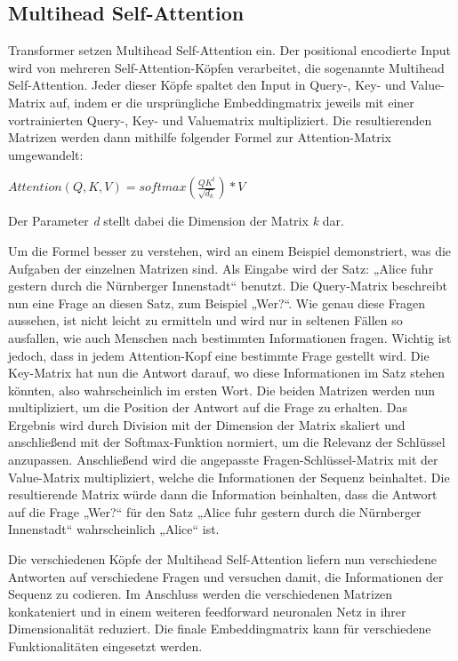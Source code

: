 \subsection{Multihead Self-Attention}

Transformer setzen Multihead Self-Attention ein.
Der positional encodierte Input wird von mehreren Self-Attention-Köpfen verarbeitet, die sogenannte Multihead Self-Attention.
Jeder dieser Köpfe spaltet den Input in Query-, Key- und Value-Matrix auf, indem er die ursprüngliche Embeddingmatrix jeweils mit einer vortrainierten Query-, Key- und Valuematrix multipliziert.
Die resultierenden Matrizen werden dann mithilfe folgender Formel zur Attention-Matrix umgewandelt:

$Attention(Q,K,V)=softmax(\frac{QK^t}{\sqrt{d_k}})*V$

Der Parameter \textit{d} stellt dabei die Dimension der Matrix \textit{k} dar.

Um die Formel besser zu verstehen, wird an einem Beispiel demonstriert, was die Aufgaben der einzelnen Matrizen sind.
Als Eingabe wird der Satz: „Alice fuhr gestern durch die Nürnberger Innenstadt“ benutzt.
Die Query-Matrix beschreibt nun eine Frage an diesen Satz, zum Beispiel „Wer?“.
Wie genau diese Fragen aussehen, ist nicht leicht zu ermitteln und wird nur in seltenen Fällen so ausfallen, wie auch Menschen nach bestimmten Informationen fragen.
Wichtig ist jedoch, dass in jedem Attention-Kopf eine bestimmte Frage gestellt wird.
Die Key-Matrix hat nun die Antwort darauf, wo diese Informationen im Satz stehen könnten, also wahrscheinlich im ersten Wort.
Die beiden Matrizen werden nun multipliziert, um die Position der Antwort auf die Frage zu erhalten.
Das Ergebnis wird durch Division mit der Dimension der Matrix skaliert und anschließend mit der Softmax-Funktion normiert, um die Relevanz der Schlüssel anzupassen.
Anschließend wird die angepasste Fragen-Schlüssel-Matrix mit der Value-Matrix multipliziert, welche die Informationen der Sequenz beinhaltet.
Die resultierende Matrix würde dann die Information beinhalten, dass die Antwort auf die Frage „Wer?“ für den Satz „Alice fuhr gestern durch die Nürnberger Innenstadt“ wahrscheinlich „Alice“ ist.~\cite{ng2023}

Die verschiedenen Köpfe der Multihead Self-Attention liefern nun verschiedene Antworten auf verschiedene Fragen und versuchen damit, die Informationen der Sequenz zu codieren.
Im Anschluss werden die verschiedenen Matrizen konkateniert und in einem weiteren feedforward neuronalen Netz in ihrer Dimensionalität reduziert.
Die finale Embeddingmatrix kann für verschiedene Funktionalitäten eingesetzt werden.

